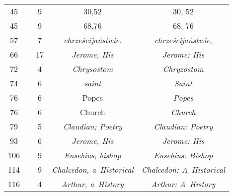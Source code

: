 \documentclass[a4paper,11pt]{article}
\begin{document}
\begin{center}
\begin{tabular}{|c|c|c|c|c|}
    45  & &  9 & 30,52 & 30, 52 \\
    45  & &  9 & 68,76 & 68, 76 \\
    57  & &  7 & \textit{chrześcijaństwie}. & \textit{chrześcijaństwie}, \\
    66  & & 17 & \textit{Jerome, His} & \textit{Jerome: His} \\
    72  & &  4 & \textit{Chrysostom} & \textit{Chryzostom} \\
    74  & &  6 & \textit{saint} & \textit{Saint} \\
    76  & &  6 & Popes & \textit{Popes} \\
    76  & &  6 & Church & \textit{Church} \\
    79  & &  5 & \textit{Claudian; Poetry} & \textit{Claudian: Poetry} \\
    93  & &  6 & \textit{Jerome, His} & \textit{Jerome: His} \\
    106 & &  9 & \textit{Eusebius, bishop} & \textit{Eusebius: Bishop} \\
    114 & &  9 & \textit{Chalcedon, a~Historical}
           & \textit{Chalcedon: A~Historical} \\
    116 & &  4 & \textit{Arthur, a~History} & \textit{Arthur: A~History} \\
    \hline
  \end{tabular}






\end{center}
\end{document}
